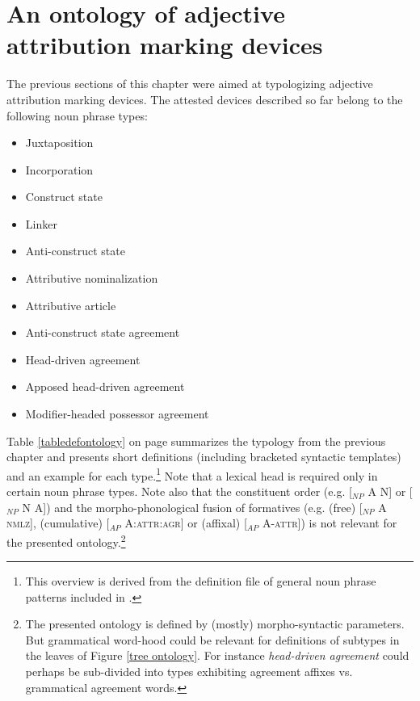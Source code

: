 %
%
%
%

\chapter[Ontology of attribution marking]{An ontology of adjective attribution marking devices}
The previous sections of this chapter were aimed at typologizing adjective attribution marking devices. The attested devices described so far belong to the following noun phrase types:
\begin{itemize}
\item{Juxtaposition}
\item{Incorporation}
\item{Construct state}
\item{Linker}
\item{Anti-construct state}
\item{Attributive nominalization}
\item{Attributive article}
\item{Anti-construct state agreement}
\item{Head-driven agreement}
\item{Apposed head-driven agreement}
\item{Modifier-headed possessor agreement}
\end{itemize}
Table \ref{tabledefontology} on page \pageref{tabledefontology} summarizes the typology from the previous chapter and presents short definitions (including bracketed syntactic templates) and an example for each type.\footnote{This overview is derived from the definition file of general noun phrase patterns included in \citet{AUTOTYP-NP}.} Note that a lexical head is required only in certain noun phrase types. Note also that the constituent order (e.g. [$_{NP}$ A N] or [$_{NP}$ N A]) and the morpho-phonological fusion of formatives (e.g. (free) [$_{NP}$ A \textsc{nmlz}], (cumulative) [$_{AP}$ A:\textsc{attr:agr}] or (affixal) [$_{AP}$ A-\textsc{attr}]) is not relevant for the presented ontology.\footnote{The presented ontology is defined by (mostly) morpho-syntactic parameters. But grammatical word-hood could be relevant for definitions of subtypes in the leaves of Figure \ref{tree ontology}. For instance {\it head-driven agreement} could perhaps be sub-divided into types exhibiting agreement affixes vs. grammatical agreement words.}


